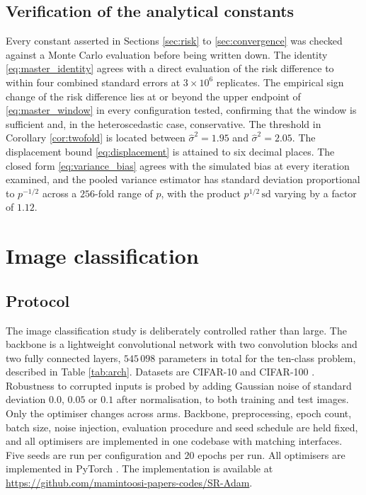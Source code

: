 \documentclass[pdflatex,sn-mathphys-num]{sn-jnl}%
\theoremstyle{thmstyleone}%
\theoremstyle{thmstyletwo}%
\theoremstyle{thmstylethree}%
\newcommand{\torerun}[1]{\textcolor{red}{\textbf{[#1]}}}
\begin{document}
\subsection{Verification of the analytical constants}

Every constant asserted in Sections \ref{sec:risk} to \ref{sec:convergence} was checked against a Monte Carlo evaluation before being written down. The identity \eqref{eq:master_identity} agrees with a direct evaluation of the risk difference to within four combined standard errors at $3\times10^{6}$ replicates. The empirical sign change of the risk difference lies at or beyond the upper endpoint of \eqref{eq:master_window} in every configuration tested, confirming that the window is sufficient and, in the heteroscedastic case, conservative. The threshold in Corollary \ref{cor:twofold} is located between $\hat\sigma^2=1.95$ and $\hat\sigma^2=2.05$. The displacement bound \eqref{eq:displacement} is attained to six decimal places. The closed form \eqref{eq:variance_bias} agrees with the simulated bias at every iteration examined, and the pooled variance estimator has standard deviation proportional to $p^{-1/2}$ across a $256$-fold range of $p$, with the product $p^{1/2}\,\mathrm{sd}$ varying by a factor of $1.12$.

\section{Image classification}
\label{sec:experiments}

\subsection{Protocol}

The image classification study is deliberately controlled rather than large. The backbone is a lightweight convolutional network with two convolution blocks and two fully connected layers, $545\,098$ parameters in total for the ten-class problem, described in Table \ref{tab:arch}. Datasets are CIFAR-10 and CIFAR-100 \cite{krizhevsky2009}. Robustness to corrupted inputs is probed by adding Gaussian noise of standard deviation $0.0$, $0.05$ or $0.1$ after normalisation, to both training and test images. Only the optimiser changes across arms. Backbone, preprocessing, epoch count, batch size, noise injection, evaluation procedure and seed schedule are held fixed, and all optimisers are implemented in one codebase with matching interfaces. Five seeds are run per configuration and $20$ epochs per run. All optimisers are implemented in PyTorch \cite{paszke2019}. The implementation is available at \url{https://github.com/mamintoosi-papers-codes/SR-Adam}.
\end{document}
